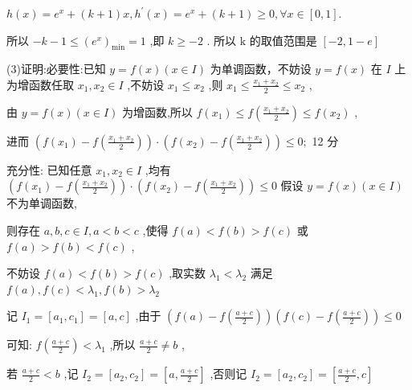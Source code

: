\documentclass[10pt]{article}
\begin{document}
\(h\left( x\right)  = {e}^{x} + \left( {k + 1}\right) x,{h}^{\prime }\left( x\right)  = {e}^{x} + \left( {k + 1}\right)  \geq  0,\forall x \in  \left\lbrack  {0,1}\right\rbrack  .\)

所以 \(- k - 1 \leq  {\left( {e}^{x}\right) }_{\min } = 1\) ,即 \(k \geq   - 2\) . 所以 \(\mathrm{k}\) 的取值范围是 \(\left\lbrack  {-2,1 - e}\right\rbrack\)

(3)证明:必要性:已知 \(y = f\left( x\right) \left( {x \in  I}\right)\) 为单调函数，不妨设 \(y = f\left( x\right)\) 在 \(I\) 上为增函数任取 \({x}_{1},{x}_{2} \in  I\) ,不妨设 \({x}_{1} \leq  {x}_{2}\) ,则 \({x}_{1} \leq  \frac{{x}_{1} + {x}_{2}}{2} \leq  {x}_{2}\) ,

由 \(y = f\left( x\right) \left( {x \in  I}\right)\) 为增函数,所以 \(f\left( {x}_{1}\right)  \leq  f\left( \frac{{x}_{1} + {x}_{2}}{2}\right)  \leq  f\left( {x}_{2}\right)\) ,

进而 \(\left( {f\left( {x}_{1}\right)  - f\left( \frac{{x}_{1} + {x}_{2}}{2}\right) }\right)  \cdot  \left( {f\left( {x}_{2}\right)  - f\left( \frac{{x}_{1} + {x}_{2}}{2}\right) }\right)  \leq  0;\) 12 分

充分性: 已知任意 \({x}_{1},{x}_{2} \in  I\) ,均有 \(\left( {f\left( {x}_{1}\right)  - f\left( \frac{{x}_{1} + {x}_{2}}{2}\right) }\right)  \cdot  \left( {f\left( {x}_{2}\right)  - f\left( \frac{{x}_{1} + {x}_{2}}{2}\right) }\right)  \leq  0\) 假设 \(y = f\left( x\right) \left( {x \in  I}\right)\) 不为单调函数,

则存在 \(a,b,c \in  I,a < b < c\) ,使得 \(f\left( a\right)  < f\left( b\right)  > f\left( c\right)\) 或 \(f\left( a\right)  > f\left( b\right)  < f\left( c\right)\) ,

不妨设 \(f\left( a\right)  < f\left( b\right)  > f\left( c\right)\) ,取实数 \({\lambda }_{1} < {\lambda }_{2}\) 满足 \(f\left( a\right) ,f\left( c\right)  < {\lambda }_{1},f\left( b\right)  > {\lambda }_{2}\)

记 \({I}_{1} = \left\lbrack  {{a}_{1},{c}_{1}}\right\rbrack   = \left\lbrack  {a,c}\right\rbrack\) ,由于 \(\left( {f\left( a\right)  - f\left( \frac{a + c}{2}\right) }\right) \left( {f\left( c\right)  - f\left( \frac{a + c}{2}\right) }\right)  \leq  0\)

可知: \(f\left( \frac{a + c}{2}\right)  < {\lambda }_{1}\) ,所以 \(\frac{a + c}{2} \neq  b\) ,

若 \(\frac{a + c}{2} < b\) ,记 \({I}_{2} = \left\lbrack  {{a}_{2},{c}_{2}}\right\rbrack   = \left\lbrack  {a,\frac{a + c}{2}}\right\rbrack\) ,否则记 \({I}_{2} = \left\lbrack  {{a}_{2},{c}_{2}}\right\rbrack   = \left\lbrack  {\frac{a + c}{2},c}\right\rbrack\)
\end{document}
